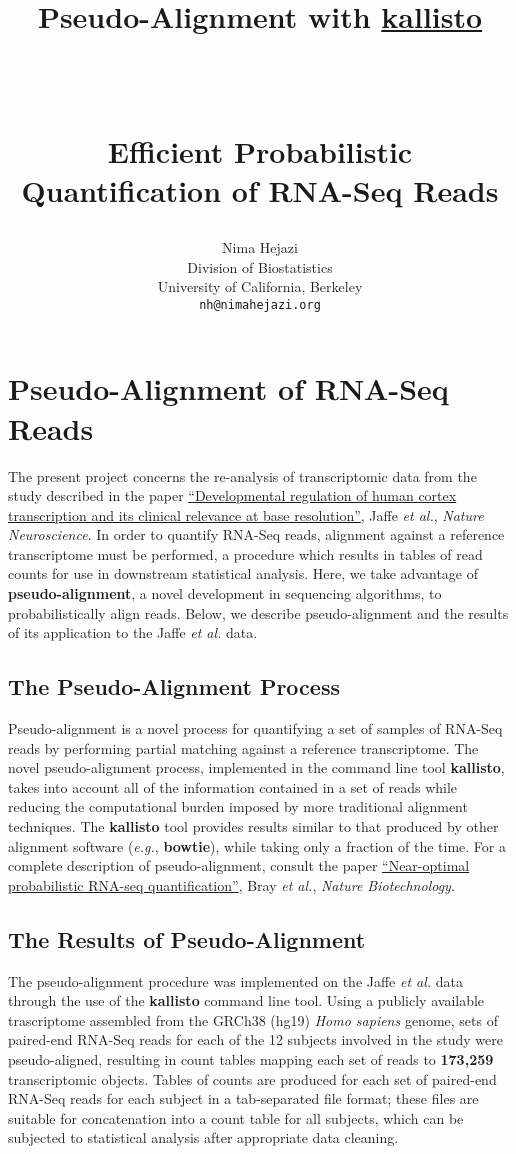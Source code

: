 \documentclass[paper=a4, fontsize=11pt]{scrartcl} %
\title{ \vspace{-1in} \usefont{OT1}{bch}{b}{n}
\huge \strut Pseudo-Alignment with
{\href{https://pachterlab.github.io/kallisto/about}{kallisto}} \strut \\
\Large \bfseries \strut Efficient Probabilistic Quantification of RNA-Seq Reads
  \strut
}
\author{ \usefont{OT1}{bch}{m}{n}
        Nima Hejazi\\ \usefont{OT1}{bch}{m}{n}
        Division of Biostatistics\\
        University of California, Berkeley\\ \usefont{OT1}{bch}{m}{n}
        \texttt{nh@nimahejazi.org}
}
\date{}
\begin{document}
\maketitle
\section{Pseudo-Alignment of RNA-Seq Reads}
The present project concerns the re-analysis of transcriptomic data from the
study described in the paper
{\href{http://www.nature.com/neuro/journal/v18/n1/abs/nn.3898.html}{``Developmental
regulation of human cortex transcription and its clinical relevance at base
resolution''}}, Jaffe \textit{et al.}, \textit{Nature Neuroscience}. In order to
quantify RNA-Seq reads, alignment against a reference transcriptome must be
performed, a procedure which results in tables of read counts for use in
downstream statistical analysis. Here, we take advantage of
\textbf{pseudo-alignment}, a novel development in sequencing algorithms, to
probabilistically align reads. Below, we describe pseudo-alignment and the
results of its application to the Jaffe \textit{et al.} data.

\subsection{The Pseudo-Alignment Process}
Pseudo-alignment is a novel process for quantifying a set of samples of RNA-Seq
reads by performing partial matching against a reference transcriptome. The
novel pseudo-alignment process, implemented in the command line tool
\textbf{kallisto}, takes into account all of the information contained in a set
of reads while reducing the computational burden imposed by more traditional
alignment techniques. The \textbf{kallisto} tool provides results similar to
that produced by other alignment software (\textit{e.g.}, \textbf{bowtie}),
while taking only a fraction of the time. For a complete description of
pseudo-alignment, consult the paper
{\href{http://www.nature.com/nbt/journal/v34/n5/full/nbt.3519.html}{``Near-optimal
probabilistic RNA-seq quantification''}}, Bray \textit{et al.}, \textit{Nature
Biotechnology}.

\subsection{The Results of Pseudo-Alignment}
The pseudo-alignment procedure was implemented on the Jaffe \textit{et al.} data
through the use of the \textbf{kallisto} command line tool. Using a publicly
available trascriptome assembled from the GRCh38 (hg19) \textit{Homo sapiens}
genome, sets of paired-end RNA-Seq reads for each of the 12 subjects involved in
the study were pseudo-aligned, resulting in count tables mapping each set of
reads to \textbf{173,259} transcriptomic objects. Tables of counts are produced
for each set of paired-end RNA-Seq reads for each subject in a tab-separated
file format; these files are suitable for concatenation into a count table for
all subjects, which can be subjected to statistical analysis after appropriate
data cleaning.
\end{document}
